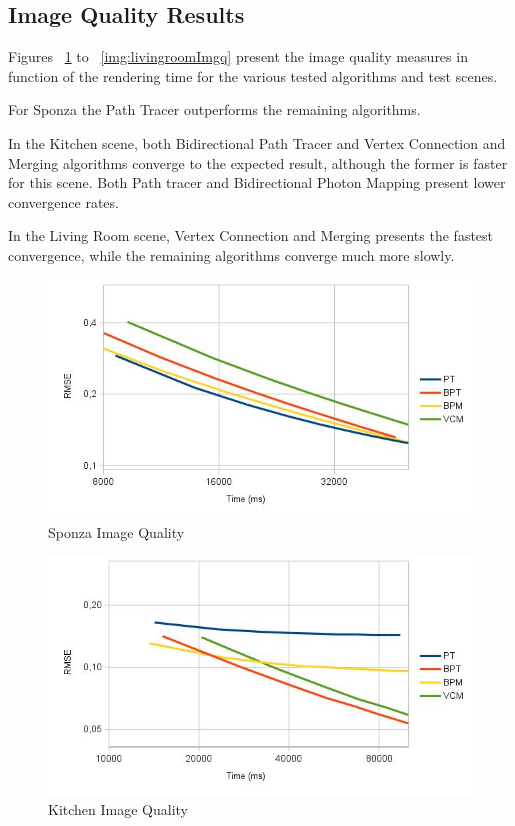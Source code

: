 \subsection{Image Quality Results}

Figures ~\ref{img:sponzaImgq} to ~\ref{img:livingroomImgq} present the image quality measures in function of the rendering time for the various tested algorithms and test scenes.

For Sponza the Path Tracer outperforms the remaining algorithms.

In the Kitchen scene, both Bidirectional Path Tracer and Vertex Connection and Merging algorithms converge to the expected result, although the former is faster for this scene. Both Path tracer and Bidirectional Photon Mapping present lower convergence rates.

In the Living Room scene, Vertex Connection and Merging presents the fastest convergence, while the remaining algorithms converge much more slowly.

\begin{figure}[H]
\centering
\includegraphics[width=0.8\linewidth]{img/sponzaImgq.jpg}
\caption{\label{img:sponzaImgq} Sponza Image Quality}
\end{figure}

\begin{figure}[H]
\centering
\includegraphics[width=0.8\linewidth]{img/kitchenImgq.jpg}
\caption{\label{img:kitchenImgq} Kitchen Image Quality}
\end{figure}

